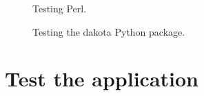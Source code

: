 \begin{figure}[!htbp]
  \caption{Testing Perl.}
  \label{fig:perl_test}
\end{figure}

\begin{figure}[!htbp]
  \caption{Testing the dakota Python package.}
  \label{fig:dakota_py_test}
\end{figure}

\clearpage
\section{Test the \texttt{\getsoftwarename{}} application}
\label{sec:test_local}

